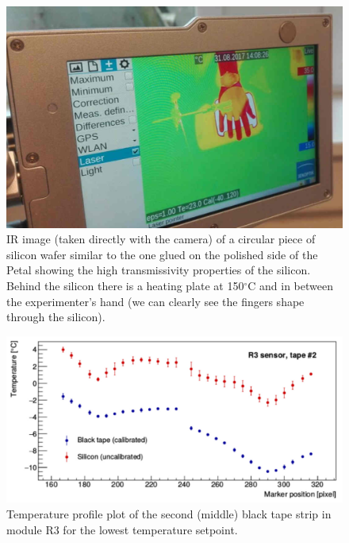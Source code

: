		\begin{figure}[ht!]
			\centering
			\captionsetup{justification=centering,margin=2cm}
			\includegraphics[scale=0.35]{Figures/Chapter04/HandTransmission.jpg}
			\caption{IR image (taken directly with the camera) of a circular piece of silicon wafer similar to the one glued on the polished side of the Petal showing the high transmissivity properties of the silicon. Behind the silicon there is a heating plate at 150\space$^{\circ}$C and in between the experimenter’s hand (we can clearly see the fingers shape through the silicon).}\label{fig4.4}
		\end{figure}
		
		\begin{figure}[ht!]
			\centering
			\captionsetup{justification=centering,margin=2cm}
			\includegraphics[scale=0.35]{Figures/Chapter04/R3Profile_Si_and_BT.jpg}
			\caption{Temperature profile plot of the second (middle) black tape strip in module R3 for the lowest temperature setpoint.}\label{fig4.5}
		\end{figure}
		
